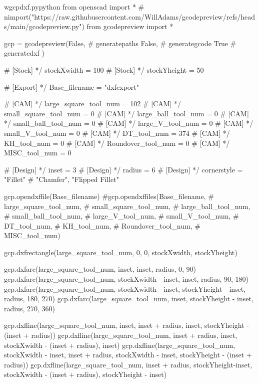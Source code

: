 \documentclass{ltxdoc}
\begin{document}
\lstset{firstnumber=1}%
\begin{writecode}{w}{gcpdxf.py}{python}
from openscad import *
# nimport("https://raw.githubusercontent.com/WillAdams/gcodepreview/refs/heads/main/gcodepreview.py")
from gcodepreview import *

gcp = gcodepreview(False, # generatepaths
                   False, # generategcode
                   True   # generatedxf
                   )

# [Stock] */
stockXwidth = 100
# [Stock] */
stockYheight = 50

# [Export] */
Base_filename = "dxfexport"


# [CAM] */
large_square_tool_num = 102
# [CAM] */
small_square_tool_num = 0
# [CAM] */
large_ball_tool_num = 0
# [CAM] */
small_ball_tool_num = 0
# [CAM] */
large_V_tool_num = 0
# [CAM] */
small_V_tool_num = 0
# [CAM] */
DT_tool_num = 374
# [CAM] */
KH_tool_num = 0
# [CAM] */
Roundover_tool_num = 0
# [CAM] */
MISC_tool_num = 0

# [Design] */
inset = 3
# [Design] */
radius = 6
# [Design] */
cornerstyle = "Fillet"  # "Chamfer", "Flipped Fillet"

gcp.opendxffile(Base_filename)
#gcp.opendxffiles(Base_filename, 
#                 large_square_tool_num, 
#                 small_square_tool_num, 
#                 large_ball_tool_num, 
#                 small_ball_tool_num, 
#                 large_V_tool_num, 
#                 small_V_tool_num, 
#                 DT_tool_num, 
#                 KH_tool_num, 
#                 Roundover_tool_num, 
#                 MISC_tool_num)

gcp.dxfrectangle(large_square_tool_num, 0, 0, stockXwidth, stockYheight)

gcp.dxfarc(large_square_tool_num, inset, inset, radius,  0, 90)
gcp.dxfarc(large_square_tool_num, stockXwidth - inset, inset, radius, 90, 180)
gcp.dxfarc(large_square_tool_num, stockXwidth - inset, stockYheight - inset, radius, 180, 270)
gcp.dxfarc(large_square_tool_num, inset, stockYheight - inset, radius, 270, 360)

gcp.dxfline(large_square_tool_num, inset, inset + radius, inset, stockYheight - (inset + radius))
gcp.dxfline(large_square_tool_num, inset + radius, inset, stockXwidth - (inset + radius), inset)
gcp.dxfline(large_square_tool_num, stockXwidth - inset, inset + radius, stockXwidth - inset, stockYheight - (inset + radius))
gcp.dxfline(large_square_tool_num, inset + radius, stockYheight-inset, stockXwidth - (inset + radius), stockYheight - inset)
    

\end{writecode}
\end{document}

